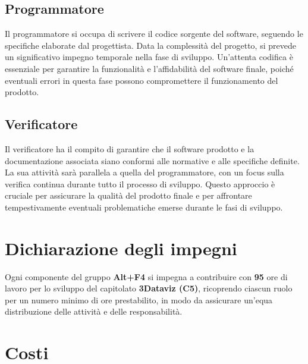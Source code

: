 \documentclass[a4paper, 12pt]{article}
\begin{document}
\subsection{Programmatore}
Il programmatore si occupa di scrivere il codice sorgente del software, seguendo le specifiche elaborate dal progettista. Data la complessità del progetto, si prevede un significativo impegno temporale nella fase di sviluppo. 
Un'attenta codifica è essenziale per garantire la funzionalità e l'affidabilità del software finale, poiché eventuali errori in questa fase possono compromettere il funzionamento del prodotto.
\subsection{Verificatore}
Il verificatore ha il compito di garantire che il software prodotto e la documentazione associata siano conformi alle normative e alle specifiche definite. 
La sua attività sarà parallela a quella del programmatore, con un focus sulla verifica continua durante tutto il processo di sviluppo. 
Questo approccio è cruciale per assicurare la qualità del prodotto finale e per affrontare tempestivamente eventuali problematiche emerse durante le fasi di sviluppo.

\newpage
\section {Dichiarazione degli impegni}
Ogni componente del gruppo \textbf{Alt+F4} si impegna a contribuire con \textbf{95} ore di lavoro per lo sviluppo del capitolato
\textbf{ 3Dataviz (C5)}, ricoprendo ciascun ruolo per un numero minimo di ore prestabilito, in modo da assicurare un’equa distribuzione delle attività e delle responsabilità.
\section{Costi}
\end{document}
